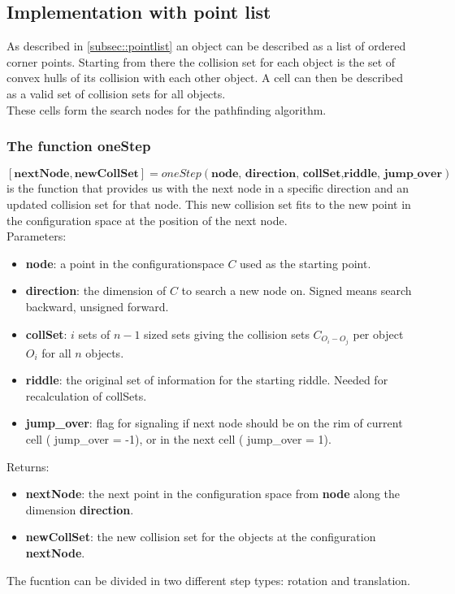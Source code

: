 \subsection{Implementation with point list}
As described in \ref{subsec::pointlist} an object can be described as a list of ordered corner points. Starting from there the collision set for each object is the set of convex hulls of its collision with each other object. A cell can then be described as a valid set of collision sets for all objects.\\
These cells form the search nodes for the pathfinding algorithm.
\subsubsection{The function oneStep}
$[\textbf{nextNode}, \textbf{newCollSet} ]=oneStep(\textbf{node, direction, collSet,riddle, jump\_over})$ is the function that provides us with the next node in a specific direction and an updated collision set for that node. This new collision set fits to the new point in the configuration space at the position of the next node.\\
Parameters:
\begin{itemize}
\item \textbf{node}: a point in the configurationspace $C$ used as the starting point.
\item \textbf{direction}: the dimension of $C$ to search a new node on. Signed means search backward, unsigned forward. 
\item \textbf{collSet}: $i$ sets of $n-1$ sized sets giving the collision sets $C_{O_i-O_j}$ per object $O_i$ for all $n$ objects.
\item \textbf{riddle}: the original set of information for the starting riddle. Needed for recalculation of collSets.
\item \textbf{jump\_over}: flag for signaling if next node should be on the rim of current cell ( jump\_over = -1), or in the next cell ( jump\_over = 1).
\end{itemize}
Returns:
\begin{itemize}
\item \textbf{nextNode}: the next point in the configuration space from \textbf{node} along the dimension \textbf{direction}.
\item \textbf{newCollSet}: the new collision set for the objects at the configuration \textbf{nextNode}.
\end{itemize}
The fucntion can be divided in two different step types: rotation and translation. \\
